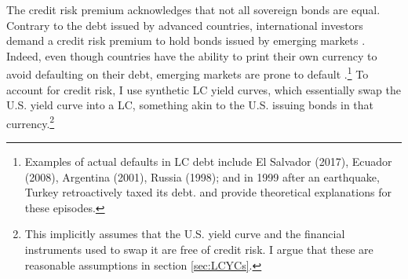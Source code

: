{%
The credit risk premium acknowledges that not all sovereign bonds are equal.
Contrary to the debt issued by advanced countries,
international investors demand a credit risk premium to hold bonds issued by emerging markets \citep{DuSchreger:2016JoF}.
Indeed, even though countries have the ability to
print their own currency to avoid defaulting on their debt, emerging markets are prone to default  \citep{ReinhartRogoff:2011,ErceMallucci:2018}.\footnote{ Examples of actual defaults in LC debt include El Salvador (2017), Ecuador (2008), Argentina (2001), Russia (1998); and in 1999 after an earthquake, Turkey retroactively taxed its debt. \cite{DuSchreger:2016WP} and \cite{OttonelloPerez:2019} provide theoretical explanations for these episodes.} 
To account for credit risk, 
I use synthetic LC yield curves, which essentially swap the U.S. yield curve into a LC,
something akin to the U.S. issuing bonds in that currency.\footnote{ This implicitly assumes that the U.S. yield curve and the financial instruments used to swap it are free of credit risk. I argue that these are reasonable assumptions in section \ref{sec:LCYCs}.}
}

